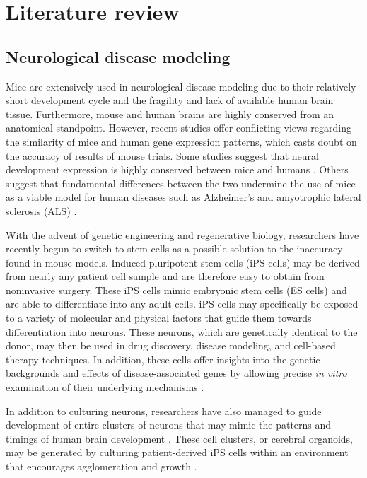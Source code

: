 \documentclass[12pt,oneside,onecolumn,a4paper]{article}
\begin{document}
\section{Literature review}

\subsection{Neurological disease modeling}

Mice are extensively used in neurological disease modeling due to their relatively short development cycle and the fragility and lack of available human brain tissue. Furthermore, mouse and human brains are highly conserved from an anatomical standpoint. However, recent studies offer conflicting views regarding the similarity of mice and human gene expression patterns, which casts doubt on the accuracy of results of mouse trials. Some studies suggest that neural development expression is highly conserved between mice and humans \citep{Lin_2014}. Others suggest that fundamental differences between the two undermine the use of mice as a viable model for human diseases such as Alzheimer's and amyotrophic lateral sclerosis (ALS) \citep{Burns_2015}.

With the advent of genetic engineering and regenerative biology, researchers have recently begun to switch to stem cells as a possible solution to the inaccuracy found in mouse models. Induced pluripotent stem cells
(iPS cells) may be derived from nearly any patient cell sample and are therefore easy to obtain from noninvasive surgery. These iPS cells mimic embryonic stem cells (ES cells) and are able to differentiate into any adult cells. iPS cells may specifically be exposed to a variety of molecular and physical factors that guide them towards differentiation into neurons. These neurons, which are genetically identical to the donor, may then be used in drug discovery, disease modeling, and cell-based therapy techniques. In addition, these cells offer insights into the genetic backgrounds and effects of disease-associated genes by allowing precise \textit{in vitro} examination of their underlying mechanisms \citep{Imaizumi2014ModelingHN}.

In addition to culturing neurons, researchers have also managed to guide development of entire clusters of neurons that may mimic the patterns and timings of human brain development \citep{Lancaster_2014}. These cell clusters, or cerebral organoids, may be generated by culturing patient-derived iPS cells within an environment that encourages agglomeration and growth \citep{nguyen_wang_nikolakopoulou_2015}. 
\end{document}
